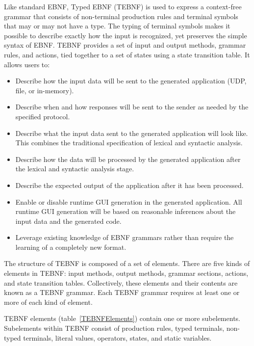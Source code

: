 \makeappendices
{}
\label{chap:TEBNF}

\label{sec:TEBNFGrammarSyntax}
Like standard EBNF, Typed EBNF (TEBNF) is used to express a context-free grammar that consists of non-terminal production rules and terminal symbols that may or may not have a type.  The typing of terminal symbols makes it possible to describe exactly how the input is recognized, yet preserves the simple syntax of EBNF.  TEBNF provides a set of input and output methods, grammar rules, and actions, tied together to a set of states using a state transition table.  It allows users to:
\begin{itemize}
  \item Describe how the input data will be sent to the generated application (UDP, file, or in-memory).
  \item Describe when and how responses will be sent to the sender as needed by the specified protocol.
  \item Describe what the input data sent to the generated application will look like.  This combines the traditional specification of lexical and syntactic analysis.
  \item Describe how the data will be processed by the generated application after the lexical and syntactic analysis stage.
  \item Describe the expected output of the application after it has been processed.
  \item Enable or disable runtime GUI generation in the generated application.  All runtime GUI generation will be based on reasonable inferences about the input data and the generated code.
  \item Leverage existing knowledge of EBNF grammars rather than require the learning of a completely new format.
\end{itemize}

\label{sec:TEBNFStructure}
The structure of TEBNF is composed of a set of elements.  There are five kinds of elements in TEBNF: input methods, output methods, grammar sections, actions, and state transition tables.  Collectively, these elements and their contents are known as a TEBNF grammar.  Each TEBNF grammar requires at least one or more of each kind of element.

\label{sec:TEBNFElementsAndSubelements}
TEBNF elements (table~\ref{TEBNFElements}) contain one or more subelements.  Subelements within TEBNF consist of production rules, typed terminals, non-typed terminals, literal values, operators, states, and static variables.


